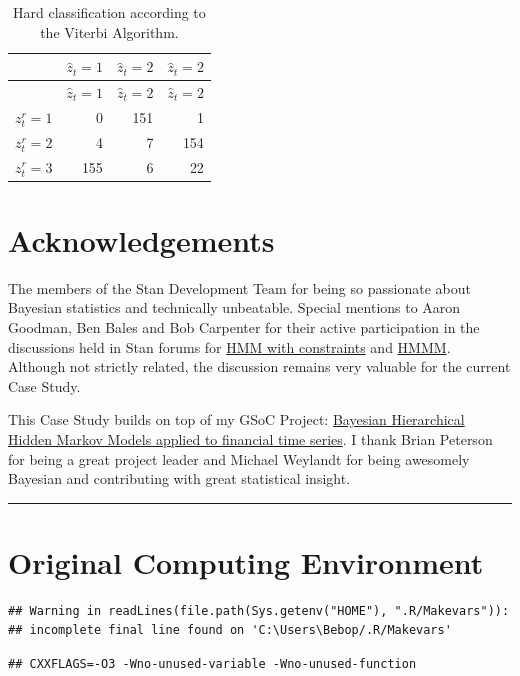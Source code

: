 \documentclass[]{article}
\begin{document}
{{{\begin{longtable}[]{@{}lrrr@{}}
\caption{Hard classification according to the Viterbi
Algorithm.}\tabularnewline
\toprule
& \(\hat{z}_t = 1\) & \(\hat{z}_t = 2\) &
\(\hat{z}_t = 2\)\tabularnewline
\midrule
\endfirsthead
\toprule
& \(\hat{z}_t = 1\) & \(\hat{z}_t = 2\) &
\(\hat{z}_t = 2\)\tabularnewline
\midrule
\endhead
\(z^r_t = 1\) & 0 & 151 & 1\tabularnewline
\(z^r_t = 2\) & 4 & 7 & 154\tabularnewline
\(z^r_t = 3\) & 155 & 6 & 22\tabularnewline
\bottomrule
\end{longtable}

\section{Acknowledgements}\label{acknowledgements}

The members of the Stan Development Team for being so passionate about
Bayesian statistics and technically unbeatable. Special mentions to
Aaron Goodman, Ben Bales and Bob Carpenter for their active
participation in the discussions held in Stan forums for
\href{http://discourse.mc-stan.org/t/hidden-markov-model-with-constraints/1625/4}{HMM
with constraints} and
\href{http://discourse.mc-stan.org/t/transversing-up-a-graph-hierarchical-hidden-markov-model/1304/11}{HMMM}.
Although not strictly related, the discussion remains very valuable for
the current Case Study.

This Case Study builds on top of my GSoC Project:
\href{https://github.com/luisdamiano/gsoc17-hhmm}{Bayesian Hierarchical
Hidden Markov Models applied to financial time series}. I thank Brian
Peterson for being a great project leader and Michael Weylandt for being
awesomely Bayesian and contributing with great statistical insight.

\begin{center}\rule{0.5\linewidth}{\linethickness}\end{center}

\section{Original Computing
Environment}\label{original-computing-environment}

\begin{verbatim}
## Warning in readLines(file.path(Sys.getenv("HOME"), ".R/Makevars")):
## incomplete final line found on 'C:\Users\Bebop/.R/Makevars'
\end{verbatim}

\begin{verbatim}
## CXXFLAGS=-O3 -Wno-unused-variable -Wno-unused-function
\end{verbatim}

}}}
\end{document}

